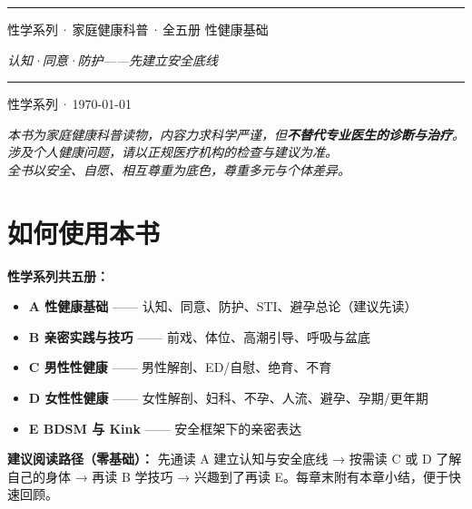 \documentclass[12pt,UTF8,openany]{ctexbook}
\begin{document}
\begin{titlepage}
\centering
\vspace*{1.5cm}
\vspace{0.6cm}
\noindent\rule{\textwidth}{0.4pt}
\vspace{0.5cm}
\myhei{} 性学系列\,·\,家庭健康科普\,·\,全五册
\vspace{2.5cm}
\myhei{} 性健康基础\par
\vspace{1.2cm}
\itshape{} 认知·同意·防护——先建立安全底线\par
\vspace{5.2cm}
\noindent\rule{\textwidth}{0.4pt}
\vspace{0.5cm}
 性学系列\,·\,\today
\end{titlepage}

\begin{center}\itshape
本书为家庭健康科普读物，内容力求科学严谨，但\textbf{不替代专业医生的诊断与治疗}。\\
涉及个人健康问题，请以正规医疗机构的检查与建议为准。\\
全书以安全、自愿、相互尊重为底色，尊重多元与个体差异。\par\end{center}
\clearpage

\chapter*{如何使用本书}
\noindent\textbf{性学系列共五册：}
\begin{itemize}[leftmargin=2em]
\item \textbf{A 性健康基础} —— 认知、同意、防护、STI、避孕总论（建议先读）
\item \textbf{B 亲密实践与技巧} —— 前戏、体位、高潮引导、呼吸与盆底
\item \textbf{C 男性性健康} —— 男性解剖、ED/自慰、绝育、不育
\item \textbf{D 女性性健康} —— 女性解剖、妇科、不孕、人流、避孕、孕期/更年期
\item \textbf{E BDSM 与 Kink} —— 安全框架下的亲密表达
\end{itemize}
\vspace{0.6em}
\noindent\textbf{建议阅读路径（零基础）：} 先通读 A 建立认知与安全底线 → 按需读 C 或 D 了解自己的身体 → 再读 B 学技巧 → 兴趣到了再读 E。每章末附有本章小结，便于快速回顾。
\clearpage
\end{document}
